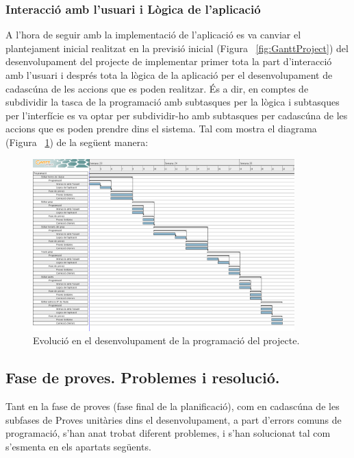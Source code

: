 \documentclass[a4paper]{report}  %
\begin{document}
\subsubsection{Interacció amb l'usuari i Lògica de l'aplicació}
A l'hora de seguir amb la implementació de l'aplicació  es va canviar el plantejament inicial realitzat en la previsió inicial (Figura ~\ref{fig:GanttProject}) del desenvolupament del projecte de implementar primer tota la part d'interacció amb l'usuari i després tota la lògica de la aplicació per el desenvolupament de cadascúna de les accions que es poden realitzar. 
És a dir, en comptes de subdividir la tasca de la programació amb subtasques per la lògica i subtasques per l'interfície es va optar per subdividir-ho amb subtasques per cadascúna de les accions que es poden prendre dins el sistema. Tal com mostra el diagrama (Figura ~\ref{fig:GanttProjectProgramacio}) de la següent manera:
		\begin{figure}[H] %
		\begin{center}
		\includegraphics[width=0.90\textwidth,keepaspectratio]{img/GanttProjectProgramacio.png}
		\caption[List caption]{Evolució en el desenvolupament de la programació del projecte.}
		\label{fig:GanttProjectProgramacio}
		\end{center}
		\end{figure}

\subsection{Fase de proves. Problemes i resolució.}
Tant en la fase de proves (fase final de la planificació), com en cadascúna de les subfases de Proves unitàries dins el desenvolupament, a part d'errors comuns de programació, s'han anat trobat diferent problemes, i s'han solucionat tal com s'esmenta en els apartats següents.
\end{document}

